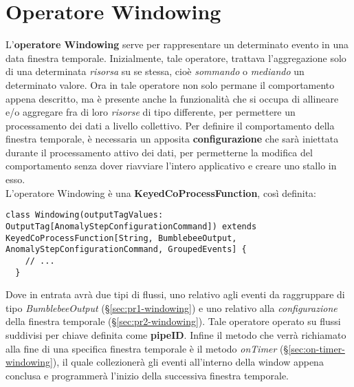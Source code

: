 \section{Operatore Windowing}
L'\textbf{operatore Windowing} serve per rappresentare un determinato evento in una data finestra temporale. Inizialmente, tale operatore, trattava l'aggregazione solo di una determinata \textit{risorsa} su se stessa, cioè \textit{sommando} o \textit{mediando} un determinato valore. Ora in tale operatore non solo permane il comportamento appena descritto, ma è presente anche la funzionalità che si occupa di allineare e/o aggregare fra di loro \textit{risorse} di tipo differente, per permettere un processamento dei dati a livello collettivo. Per definire il comportamento della finestra temporale, è necessaria un apposita \textbf{configurazione} che sarà iniettata durante il processamento attivo dei dati, per permetterne la modifica del comportamento senza dover riavviare l'intero applicativo e creare uno stallo in esso.\\
L'operatore Windowing è una \textbf{KeyedCoProcessFunction}, così definita:
\begin{verbatim}
class Windowing(outputTagValues: OutputTag[AnomalyStepConfigurationCommand]) extends KeyedCoProcessFunction[String, BumblebeeOutput, AnomalyStepConfigurationCommand, GroupedEvents] {
	// ...
  }
\end{verbatim}
Dove in entrata avrà due tipi di flussi, uno relativo agli eventi da raggruppare di tipo \textit{BumblebeeOutput} (\S\ref{sec:pr1-windowing}) e uno relativo alla \textit{configurazione} della finestra temporale (\S\ref{sec:pr2-windowing}). Tale operatore operato su flussi suddivisi per chiave definita come \textbf{pipeID}. Infine il metodo che verrà richiamato alla fine di una specifica finestra temporale è il metodo \textit{onTimer} (\S\ref{sec:on-timer-windowing}), il quale collezionerà gli eventi all'interno della window appena conclusa e programmerà l'inizio della successiva finestra temporale.

